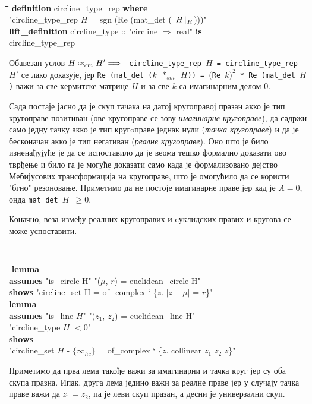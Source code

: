 {\tt
\begin{tabbing}
\hspace{5mm}\=\hspace{5mm}\=\hspace{5mm}\=\hspace{5mm}\=\hspace{5mm}\=\kill
\textbf{definition} circline\_type\_rep \textbf{where}\\
\>"circline\_type\_rep $H$ = sgn (Re (mat\_det ($\lfloor H\rfloor_{H}$)))"\\
\textbf{lift\_definition} circline\_type :: "circline $\Rightarrow$ real" \textbf{is}\\
\> circline\_type\_rep
\end{tabbing}
}
\noindent Обавезан услов $H \approx_{cm} H' \Longrightarrow$ {\tt
  circline\_type\_rep $H$ = circline\_type\_rep $H'$} се лако
доказује, јер {\tt Re (mat\_det ($k$ $*_{sm}$ $H$)) = $($Re $k)^2$ *
  Re (mat\_det $H$)} важи за све хермитске матрице $H$ и за све $k$ са
имагинарним делом $0$.

Сада постаје јасно да је скуп тачака на датој кругоправој празан акко
је тип кругоправе позитиван (ове кругоправе се зову \emph{ имагинарне
  кругоправе}), да садржи само једну тачку акко је тип кругoправе
једнак нули (\emph{тачка кругоправе}) и да је бесконачан акко је тип
негативан (\emph{реалне кругоправе}).  Оно што је било изненађујуће је
да се испоставило да је веома тешко формално доказати ово тврђење и
било га је могуће доказати само када је формализовано дејство
Мебијусових трансформација на кругоправе, што је омогућило да се
користи "бгно" резоновање. Приметимо да не постоје имагинарне праве
јер кад је $A = 0$, онда {\tt mat\_det $H$ $\ge 0$}.

Коначно, веза између реалних кругоправих и eуклидских правих и кругова
се може успоставити.
{\tt
\begin{tabbing}
\hspace{5mm}\=\hspace{5mm}\=\hspace{5mm}\=\hspace{5mm}\=\hspace{5mm}\=\kill
\textbf{lemma}\\
\> \textbf{assumes} "is\_circle H" "($\mu$, $r$) = euclidean\_circle H"\\
\>  \textbf{shows} "circline\_set H = of\_complex ` \{$z.$ $|z-\mu|$ = $r$\}"\\
\textbf{lemma}\\
\>  \textbf{assumes} \="is\_line $H$" "($z_1$, $z_2$) = euclidean\_line H"\\
\>\> "circline\_type $H$ $< 0$"\\
\>  \textbf{shows} \\
\> "circline\_set $H$ - $\{\infty_{hc}\}$ = of\_complex ` \{$z$. collinear $z_1$ $z_2$ $z$\}"
\end{tabbing}
}
\noindent Приметимо да прва лема такође важи за имагинарни и тачка
круг јер су оба скупа празна. Ипак, друга лема једино важи за реалне
праве јер у случају тачка праве важи да $z_1=z_2$, па је леви скуп
празан, а десни је универзални скуп.

